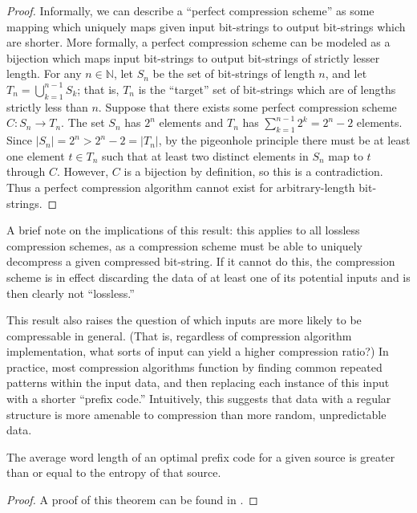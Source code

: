 \documentclass[12pt]{article}
\begin{document}
\begin{proof}
  Informally, we can describe a ``perfect compression scheme'' as some
  mapping which uniquely maps given input bit-strings to output
  bit-strings which are shorter. More formally, a perfect compression
  scheme can be modeled as a bijection which maps input bit-strings to
  output bit-strings of strictly lesser length. For any
  $n \in \mathbb{N}$, let $S_n$ be the set of bit-strings of length
  $n$, and let $T_n = \bigcup_{k = 1}^{n - 1} S_k$; that is, $T_n$ is
  the ``target'' set of bit-strings which are of lengths strictly less
  than $n$. Suppose that there exists some perfect compression scheme
  $C:S_n \to T_n$. The set $S_n$ has $2^n$ elements and $T_n$ has
  $\sum_{k=1}^{n-1}2^k = 2^n - 2$ elements. Since
  $|S_n| = 2^n > 2^n - 2 = |T_n|$, by the pigeonhole principle there
  must be at least one element $t \in T_n$ such that at least two
  distinct elements in $S_n$ map to $t$ through $C$. However, $C$ is a
  bijection by definition, so this is a contradiction. Thus a perfect
  compression algorithm cannot exist for arbitrary-length bit-strings.
\end{proof}

A brief note on the implications of this result: this applies to all
lossless compression schemes, as a compression scheme must be able to
uniquely decompress a given compressed bit-string. If it cannot do
this, the compression scheme is in effect discarding the data of at
least one of its potential inputs and is then clearly not
``lossless.''

This result also raises the question of which inputs are more likely
to be compressable in general.  (That is, regardless of compression
algorithm implementation, what sorts of input can yield a higher
compression ratio?) In practice, most compression algorithms function
by finding common repeated patterns within the input data, and then
replacing each instance of this input with a shorter ``prefix code.''
Intuitively, this suggests that data with a regular structure is more
amenable to compression than more random, unpredictable data.

\begin{Theorem}
  \label{snct}
  The average word length of an optimal prefix code for a given source
  is greater than or equal to the entropy of that source.
\end{Theorem}

\begin{proof}
  A proof of this theorem can be found in \cite{Shannon}.
\end{proof}
\end{document}
